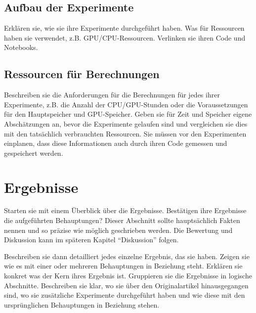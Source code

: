 \documentclass[DIV=13,fontsize=11pt]{scrartcl}
\begin{document}
\subsection{Aufbau der Experimente}
Erklären sie, wie sie ihre Experimente durchgeführt haben. Was für Ressourcen haben sie verwendet, z.B. GPU/CPU-Ressourcen.
Verlinken sie ihren Code und Notebooks. 

\subsection{Ressourcen für Berechnungen}
Beschreiben sie die Anforderungen für die Berechnungen für jedes ihrer Experimente, z.B. die Anzahl der CPU/GPU-Stunden oder die Voraussetzungen für den Hauptspeicher und GPU-Speicher. 
Geben sie für Zeit und Speicher eigene Abschätzungen an, bevor die Experimente gelaufen sind und vergleichen sie dies mit den tatsächlich verbrauchten Ressourcen.
Sie müssen vor den Experimenten einplanen, dass diese Informationen auch durch ihren Code gemessen und gespeichert werden.



\section{Ergebnisse}
Starten sie mit einem Überblick über die Ergebnisse.
Bestätigen ihre Ergebnisse die aufgeführten Behauptungen?
Dieser Abschnitt sollte hauptsächlich Fakten nennen und so präzise wie möglich geschrieben werden.
Die Bewertung und Diskussion kann im späteren Kapitel ``Diskussion'' folgen. 


Beschreiben sie dann detailliert jedes einzelne Ergebnis, das sie haben.
Zeigen sie wie es mit einer oder mehreren Behauptungen in Beziehung steht.
Erklären sie konkret was der Kern ihres Ergebnis ist.
Gruppieren sie die Ergebnisse in logische Abschnitte.
Beschreiben sie klar, wo sie über den Originalartikel hinausgegangen sind, wo sie zusätzliche Experimente durchgeführt haben und wie diese mit den ursprünglichen Behauptungen in Beziehung stehen.
\end{document}
